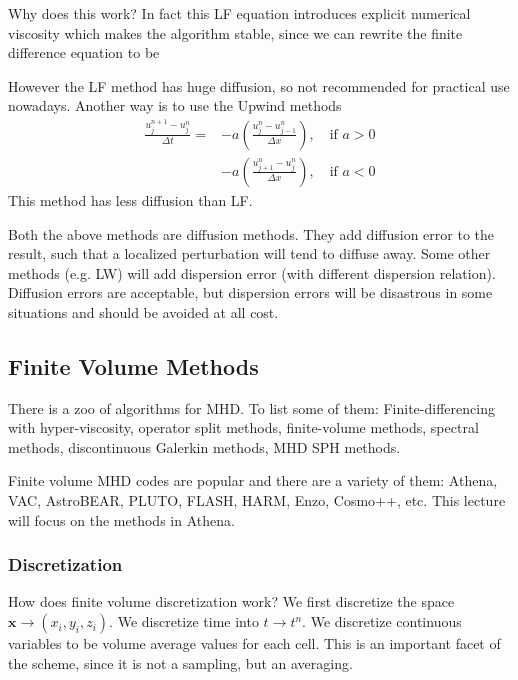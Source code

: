 \documentclass[letterpaper, 11pt]{article}
\numberwithin{equation}{section}
\numberwithin{figure}{section}
\begin{document}
Why does this work? In fact this LF equation introduces explicit numerical
viscosity which makes the algorithm stable, since we can rewrite the finite
difference equation to be %

However the LF method has huge diffusion, so not recommended for practical use
nowadays. Another way is to use the Upwind methods
\begin{equation}
  \label{eq:11}
  \begin{split}
  \frac{u_j^{n+1} - u_j^n}{\Delta t} =&
    -a \left( \frac{u_j^n - u_{j-1}^n}{\Delta x} \right), \quad \text{if }a > 0 \\
    &-a \left( \frac{u_{j+1}^n - u_j^n}{\Delta x} \right), \quad \text{if }a < 0
  \end{split}
\end{equation}
This method has less diffusion than LF.

Both the above methods are diffusion methods. They add diffusion error to the
result, such that a localized perturbation will tend to diffuse away. Some other
methods (e.g. LW) will add dispersion error (with different dispersion
relation). Diffusion errors are acceptable, but dispersion errors will be
disastrous in some situations and should be avoided at all cost.

\subsection{Finite Volume Methods}

There is a zoo of algorithms for MHD. To list some of them: Finite-differencing
with hyper-viscosity, operator split methods, finite-volume methods, spectral
methods, discontinuous Galerkin methods, MHD SPH methods.

Finite volume MHD codes are popular and there are a variety of them: Athena,
VAC, AstroBEAR, PLUTO, FLASH, HARM, Enzo, Cosmo++, etc. This lecture will focus
on the methods in Athena.

\subsubsection{Discretization}

How does finite volume discretization work? We first discretize the space
$\mathbf{x} \rightarrow (x_i, y_i, z_i)$. We discretize time into $t \rightarrow
t^n$. We discretize continuous variables to be volume average values for each
cell. This is an important facet of the scheme, since it is not a sampling, but
an averaging.
\end{document}
